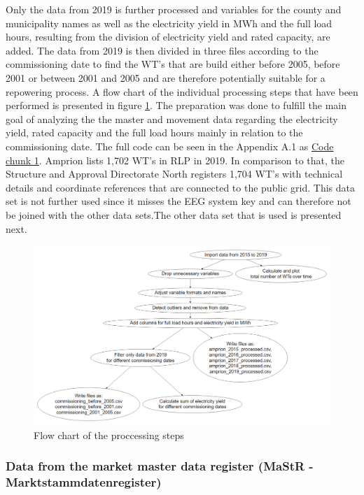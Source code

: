 \documentclass[a4paper,11pt]{article}
\begin{document}
Only the data from 2019 is further processed and variables for the county and municipality names as well as the electricity yield in MWh and the full load hours, resulting from the division of electricity yield and rated capacity, are added. The data from 2019 is then divided in three files according to the commissioning date to find the WT's that are build either before 2005, before 2001 or between 2001 and 2005 and are therefore potentially suitable for a repowering process. A flow chart of the individual processing steps that have been performed is presented in figure \ref{fig:preparation}. The preparation was done to fulfill the main goal of analyzing the the master and movement data regarding the electricity yield, rated capacity and the full load hours mainly in relation to the commissioning date. The full code can be seen in the Appendix A.1 as \protect\hyperlink{code-chunk-1}{Code chunk 1}. Amprion lists 1,702 WT's in RLP in 2019. In comparison to that, the Structure and Approval Directorate North registers 1,704 WT's with technical details and coordinate references that are connected to the public grid. This data set is not further used since it misses the EEG system key and can therefore not be joined with the other data sets.The other data set that is used is presented next.
\begin{figure}

{\centering \includegraphics[width=1\linewidth]{data/Amprion/results_of_preparation/prepflow} 

}

\caption{Flow chart of the proccessing steps}\label{fig:preparation}
\end{figure}
\hypertarget{data-from-the-market-master-data-register-mastr---marktstammdatenregister}{%
\subsubsection{Data from the market master data register (MaStR - Marktstammdatenregister)}\label{data-from-the-market-master-data-register-mastr---marktstammdatenregister}}
\end{document}
